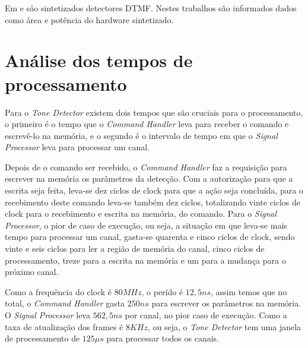 \documentclass[monografia]{subfiles}
\begin{document}
\begin{table}[!h]
\begin{tabular}{lccc}
			\end{tabular}
		\end{table}

		Em \cite{Bhavanam1} e \cite{Bhavanam2} são sintetizados detectores DTMF. Nestes trabalhos são informados dados como área e potência do hardware
		sintetizado.



		\section{Análise dos tempos de processamento}
			Para o \textit{Tone Detector} existem dois tempos que são cruciais para o processamento, 
			o primeiro é o tempo que o \textit{Command Handler} leva para receber o comando e escrevê-lo na memória, e
			o segundo é o intervalo de tempo em que o 
			\textit{Signal Processor} leva para processar um canal.

			Depois de o comando ser recebido, o \textit{Command Handler} faz a requisição para escrever na memória os parâmetros da detecção. Com a autorização
			para que a escrita seja feita, leva-se dez ciclos de clock para que a ação seja concluída, para o recebimento deste comando leva-se também dez ciclos,
			totalizando vinte ciclos de clock para o recebimento e escrita na memória, do comando.
			Para o \textit{Signal Processor}, o pior de caso de execução, ou seja, a situação em que leva-se mais tempo para processar um canal, 
			gasta-se quarenta e cinco ciclos de clock, sendo
			vinte e seis ciclos para ler a região de memória do canal, cinco ciclos de processamento, 
			treze para a escrita na memória e um para a mudança para o próximo canal.
			
			Como a frequência do clock é $80 MHz$, o perído é $12,5 ns$, assim temos que no total, o \textit{Command Handler} gasta $250ns$ para escrever
			os parâmetros na memória. O \textit{Signal Processor} leva $562,5 ns$ por canal, no pior caso de execução. 
			Como a taxa de atualização dos frames é $8KHz$, ou seja, o \textit{Tone Detector} tem uma janela
			de processamento de $125 \mu s$ para processar todos os canais.
\end{document}
